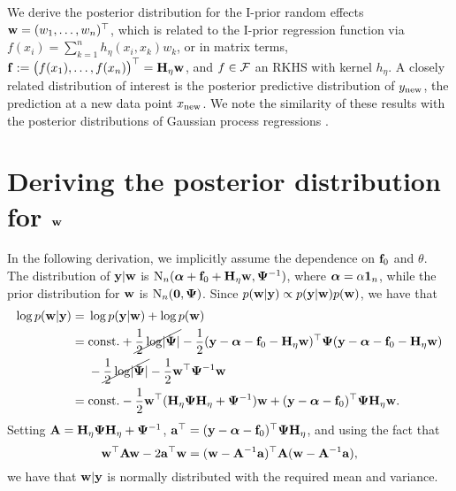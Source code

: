 We derive the posterior distribution for the I-prior random effects ${\mathbf w} = (w_1,\dots,w_n)^\top$, which is related to the I-prior regression function via $f(x_i) = \sum_{k=1}^n h_\eta(x_i,x_k)w_k$, or in matrix terms, ${\mathbf f} := \big(f(x_1),\dots,f(x_n)\big)^\top  = {\mathbf H}_\eta{\mathbf w}$, and $f \in {\mathcal F}$ an RKHS with kernel $h_\eta$.
A closely related distribution of interest is the posterior predictive distribution of $y_{\text{new}}$, the prediction at a new data point $x_{\text{new}}$.
We note the similarity of these results with the posterior distributions of Gaussian process regressions \citep{rasmussen2006gaussian}.

\section[Deriving the posterior distribution for w]{Deriving the posterior distribution for ${\mathbf w}$}
\label{apx:posteriorw}

In the following derivation, we implicitly assume the dependence on ${\mathbf f}_0$ and $\theta$.
The distribution of ${\mathbf y}|{\mathbf w}$ is $\operatorname{N}_n({\bm\alpha} + {\mathbf f}_0 +{\mathbf H}_\eta{\mathbf w},{\bm\Psi}^{-1})$, where ${\bm\alpha} = \alpha{\mathbf 1}_n$, while the prior distribution for ${\mathbf w}$ is $\operatorname{N}_n({\mathbf 0},{\bm\Psi})$.
Since $p({\mathbf w}|{\mathbf y}) \propto p({\mathbf y}|{\mathbf w})p({\mathbf w})$, we have that
\begin{align*}
  \log p({\mathbf w}|{\mathbf y}) 
  ={}&  \log p({\mathbf y}|{\mathbf w}) + \log p({\mathbf w}) \\
  ={}& \text{const.}\hspace{0.01em} + \cancel{\frac{1}{2}\log\lvert{\bm\Psi}\rvert} - \frac{1}{2} ({\mathbf y} - {\bm\alpha} - {\mathbf f}_0 - {\mathbf H}_\eta{\mathbf w})^\top {\bm\Psi} ({\mathbf y} - {\bm\alpha} - {\mathbf f}_0 - {\mathbf H}_\eta{\mathbf w}) \\
  & -\cancel{\frac{1}{2}\log\lvert{\bm\Psi}\rvert} - \frac{1}{2} {\mathbf w}^\top{\bm\Psi}^{-1}{\mathbf w} \\
  ={}& \text{const.}\hspace{0.01em} - \frac{1}{2} {\mathbf w}^\top({\mathbf H}_\eta{\bm\Psi}{\mathbf H}_\eta + {\bm\Psi}^{-1}){\mathbf w} + ({\mathbf y} - {\bm\alpha} - {\mathbf f}_0)^\top{\bm\Psi}{\mathbf H}_\eta{\mathbf w}.
\end{align*}
Setting ${\mathbf A} = {\mathbf H}_\eta{\bm\Psi}{\mathbf H}_\eta + {\bm\Psi}^{-1}$, ${\mathbf a}^\top = ({\mathbf y} - {\bm\alpha} - {\mathbf f}_0)^\top{\bm\Psi}{\mathbf H}_\eta$, and using the fact that 
\[
  {\mathbf w}^\top {\mathbf A} {\mathbf w} - 2 {\mathbf a}^\top{\mathbf w} = ({\mathbf w} - {\mathbf A}^{-1}{\mathbf a})^\top{\mathbf A}({\mathbf w} - {\mathbf A}^{-1}{\mathbf a}),
\]
we have that ${\mathbf w}|{\mathbf y}$ is normally distributed with the required mean and variance.

